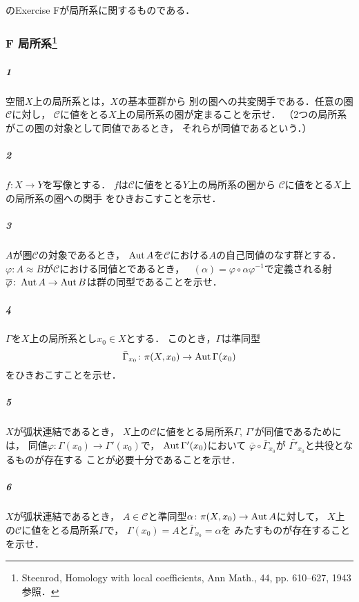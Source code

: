 \subsection{{\cite[Chap 1]{Sp66}}}
\cite[Chap 1]{Sp66}のExercise Fが局所系に関するものである．







\subsubsection*{F 局所系\footnote{
    Steenrod, Homology with local coefficients, 
    Ann Math., 44, pp. 610--627, 1943 参照．
}}

\subparagraph{1} 空間\(X\)上の局所系とは，\(X\)の基本亜群から
別の圏への共変関手である．任意の圏\(\mathcal{C}\)に対し，
\(\mathcal{C}\)に値をとる\(X\)上の局所系の圏が定まることを示せ．
（2つの局所系がこの圏の対象として同値であるとき，
それらが同値であるという．）

\subparagraph{2}
\(f\colon X\to Y\)を写像とする．
\(f\)は\(\mathcal{C}\)に値をとる\(Y\)上の局所系の圏から
\(\mathcal{C}\)に値をとる\(X\)上の局所系の圏への関手
をひきおこすことを示せ．

\subparagraph{3}
\(A\)が圏\(\mathcal{C}\)の対象であるとき，
\(\mathop{\mathrm{Aut}}\nolimits{A}\)を\(\mathcal{C}\)における\(A\)の自己同値のなす群とする．
\(\varphi\colon A\approx B\)が\(\mathcal{C}\)における同値とであるとき，
\(
    \mathop{\overline{\varphi}}(\alpha)
    =\varphi\circ\alpha\varphi^{-1}
\)で定義される射\(
    \mathop{\overline{\varphi}}\colon\mathop{\mathrm{Aut}}\nolimits{A}\to\mathop{\mathrm{Aut}}\nolimits{B}
\)は群の同型であることを示せ．

\subparagraph{4}
\(\Gamma\)を\(X\)上の局所系とし\(x_0\in X\)とする．
このとき，\(\Gamma\)は準同型
\[
    \mathop{\bar{\Gamma}_{x_0}}\colon \pi(X,x_0)\to\mathop{\mathrm{Aut}}\nolimits{\Gamma(x_0)}
\]
をひきおこすことを示せ．

\subparagraph{5}
\(X\)が弧状連結であるとき，
\(X\)上の\(\mathcal{C}\)に値をとる局所系\(\Gamma\), \(\Gamma'\)が同値であるためには，
同値\(\varphi\colon \Gamma(x_0)\to\Gamma'(x_0)\)で，
\(\mathop{\mathrm{Aut}}\nolimits{\Gamma'(x_0)}\)において
\(\bar{\varphi}\circ\bar{\Gamma}_{x_0}\)が
\(\bar{\Gamma'}_{x_0}\)と共役となるものが存在する
ことが必要十分であることを示せ．

\subparagraph{6}
\(X\)が弧状連結であるとき，
\(A\in\mathcal{C}\)と準同型\(\alpha\colon\pi(X,x_0)\to\mathop{\mathrm{Aut}}\nolimits{A}\)に対して，
\(X\)上の\(\mathcal{C}\)に値をとる局所系\(\Gamma\)で，
\(\Gamma(x_0)=A\)と\(\bar{\Gamma}_{x_0}=\alpha\)を
みたすものが存在することを示せ．


